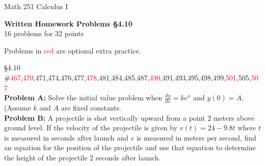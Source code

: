 \documentclass[11pt]{report}
\theoremstyle{plain}
\newcommand{\opt}[1]{\textcolor{red}{#1}}
\begin{document}
\hfill Math 251 Calculus I
\begin{center}
\Large{\textbf{Written Homework Problems \S 4.10}} \\
16 problems for 32 points\\
\end{center}

Problems in \textcolor{red}{red} are optional extra practice.\\

\begin{description}
\item{\S 4.10} \#\opt{467},\opt{470},471,474,476,477,\opt{478},481,484,485,487,\opt{490},491,493,495,498,499,\opt{501},505,\opt{507}\\

\textbf{Problem A:} Solve the initial value problem when $\frac{dy}{dx}=ke^x$ and $y(0)=A$. (Assume $k$ and $A$ are fixed constants.\\

\textbf{Problem B:} A projectile is shot vertically upward from a point 2 meters above ground level. If the velocity of the projectile is given by $v(t)=24 -9.8t$ where $t$ is measured in seconds after launch and $v$ is measured in meters per second, find an equation for the position of the projectile and use that equation to determine the height of the projectile 2 seconds after launch.

\end{description}
\end{document}
